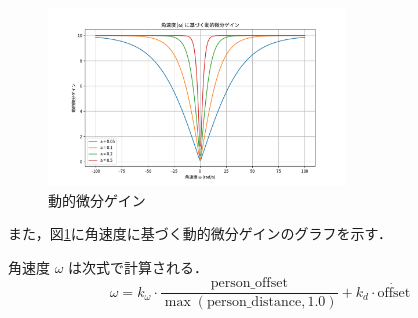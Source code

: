 \begin{figure}[H]
    \centering
    \includegraphics[width=0.7\textwidth]{figure/dynamicgain.pdf}
    \caption{動的微分ゲイン}
    \label{fig:dynamicgain}
\end{figure}
また，図\ref{fig:dynamicgain}に角速度に基づく動的微分ゲインのグラフを示す．

角速度 \(\omega\) は次式で計算される．
\begin{equation}
    \omega = k_\omega \cdot \frac{\text{person\_offset}}{\max(\text{person\_distance}, 1.0)} + k_d \cdot \dot{\text{offset}}
\end{equation}

